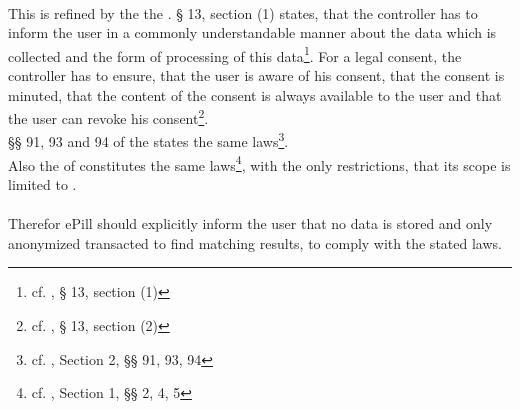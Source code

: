 \\
This is refined by the the \TMGns. § 13, section (1) states, that the controller has to inform the user in a commonly understandable manner about the data which is collected and the form of processing of this data\footnote{cf. \cite{BundesregierungderBundesrepublikDeutschland.01.03.2007}, § 13, section (1)}. For a legal consent, the controller has to ensure, that the user is aware of his consent, that the consent is minuted, that the content of the consent is always available to the user and that the user can revoke his consent\footnote{cf. \cite{BundesregierungderBundesrepublikDeutschland.01.03.2007}, § 13, section (2)}.
\\
§§ 91, 93 and 94 of the \TKG states the same laws\footnote{cf. \cite{BundesregierungderBundesrepublikDeutschland.01.08.1996}, Section 2, §§ 91, 93, 94}.
\\
Also the \DPA of \NRW constitutes the same laws\footnote{cf. \cite{DerInnenministerdesLandesNordrheinWestfalen.09.06.2000}, Section 1, §§ 2, 4, 5}, with the only restrictions, that its scope is limited to \NRWns.
\\
\\
Therefor ePill should explicitly inform the user that no data is stored and only anonymized transacted to find matching results, to comply with the stated laws.

